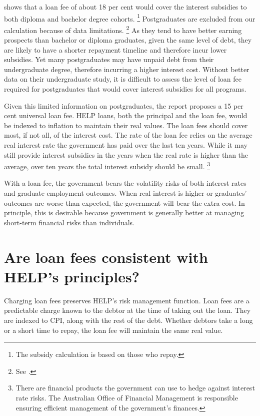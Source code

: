 \documentclass[embargoed]{grattan}
\begin{document}
 shows that a loan fee of about 18 per cent would cover the interest subsidies to both diploma and bachelor degree cohorts.%
\footnote{The subsidy calculation is based on those who repay.} Postgraduates are excluded from our calculation because of data limitations.%
\footnote{See .} As they tend to have better earning prospects than bachelor or diploma graduates, given the same level of debt, they are likely to have a shorter repayment timeline and therefore incur lower subsidies.
Yet many postgraduates may have unpaid debt from their undergraduate degree, therefore incurring a higher interest cost.
Without better data on their undergraduate study, it is difficult to assess the level of loan fee required for postgraduates that would cover interest subsidies for all programs.

Given this limited information on postgraduates, the report proposes a 15 per cent universal loan fee.
\gls{HELP} loans, both the principal and the loan fee, would be indexed to inflation to maintain their real values.
The loan fees should cover most, if not all, of the interest cost.
The rate of the loan fee relies on the average real interest rate the government has paid over the last ten years.
While it may still provide interest subsidies in the years when the real rate is higher than the average, over ten years the total interest subsidy should be small.%
\footnote{There are financial products the government can use to hedge against interest rate risks.
The Australian Office of Financial Management is responsible ensuring efficient management of the government's finances.}

With a loan fee, the government bears the volatility risks of both interest rates and graduate employment outcomes.
When real interest is higher or graduates' outcomes are worse than expected, the government will bear the extra cost.
In principle, this is desirable because government is generally better at managing short-term financial risks than individuals.

\section[Are loan fees consistent with {HELP}'s principles?]{Are loan fees consistent with \gls{HELP}'s principles?}\label{are-loan-fees-consistent-with-helps-principles}

Charging loan fees preserves \gls{HELP}'s risk management function.
Loan fees are a predictable charge known to the debtor at the time of taking out the loan.
They are indexed to \gls{CPI}, along with the rest of the debt.
Whether debtors take a long or a short time to repay, the loan fee will maintain the same real value.
\end{document}
